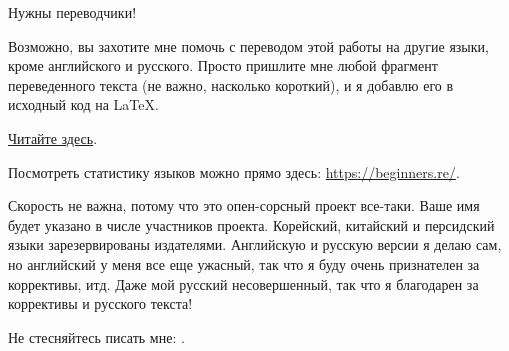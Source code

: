 \vspace*{\fill}

\Huge Нужны переводчики!
\normalsize

\bigskip
\bigskip
\bigskip

Возможно, вы захотите мне помочь с переводом этой работы на другие языки, кроме английского и русского.
Просто пришлите мне любой фрагмент переведенного текста (не важно, насколько короткий), и я добавлю его в исходный код на LaTeX.

\href{\RepoURL/Translation.md}{Читайте здесь}.

Посмотреть статистику языков можно прямо здесь: \url{https://beginners.re/}.

Скорость не важна, потому что это опен-сорсный проект все-таки.
Ваше имя будет указано в числе участников проекта.
Корейский, китайский и персидский языки зарезервированы издателями.
Английскую и русскую версии я делаю сам, но английский у меня все еще ужасный, так что я буду очень признателен за коррективы, итд.
Даже мой русский несовершенный, так что я благодарен за коррективы и русского текста!

Не стесняйтесь писать мне: \GTT{\EMAIL}.

\vspace*{\fill}
\vfill
